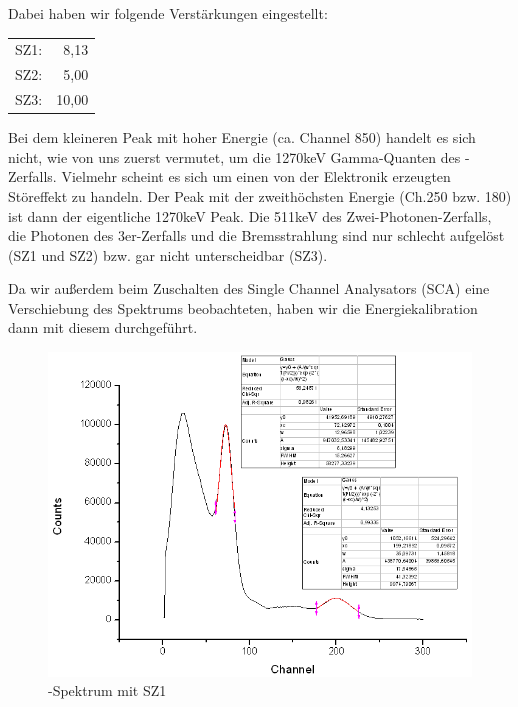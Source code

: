 Dabei haben wir folgende Verstärkungen eingestellt:

\begin{tabular}{lr}
SZ1:& 8,13\\
SZ2:& 5,00\\
SZ3:& 10,00
\end{tabular}


Bei dem kleineren Peak mit hoher Energie (ca. Channel 850) handelt es sich nicht, wie von uns zuerst vermutet, um die 1270keV Gamma-Quanten des \Na-Zerfalls. Vielmehr scheint es sich um einen von der Elektronik erzeugten Störeffekt zu handeln. Der Peak mit der zweithöchsten Energie (Ch.250 bzw. 180) ist dann der eigentliche 1270keV Peak. Die 511keV des Zwei-Photonen-Zerfalls, die Photonen des 3er-Zerfalls und die Bremsstrahlung sind nur schlecht aufgelöst (SZ1 und SZ2) bzw. gar nicht unterscheidbar (SZ3).

Da wir außerdem beim Zuschalten des Single Channel Analysators (SCA) eine Verschiebung des Spektrums beobachteten, haben wir die Energiekalibration dann mit diesem durchgeführt.
\begin{figure}[H]
 \centering \includegraphics[height=0.4\textheight]{Graphen/SZ1.png}
 \caption{\Na-Spektrum mit SZ1}
\end{figure}

